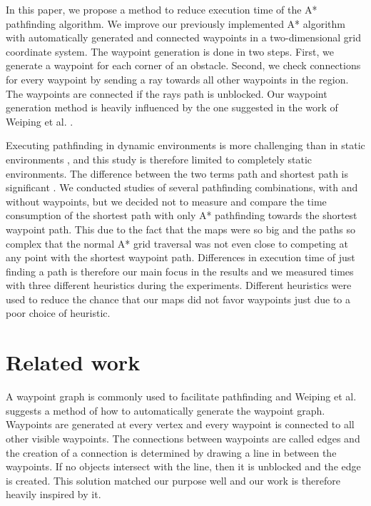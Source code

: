 \documentclass[sigconf]{acmart}
\begin{document}
In this paper, we propose a method to reduce execution time of the A* pathfinding algorithm. We improve our previously implemented A* algorithm with automatically generated and connected waypoints in a two-dimensional grid coordinate system. The waypoint generation is done in two steps. First, we generate a waypoint for each corner of an obstacle. Second, we check connections for every waypoint by sending a ray towards all other waypoints in the region. The waypoints are connected if the rays path is unblocked. Our waypoint generation method is heavily influenced by the one suggested in the work of Weiping et al. \cite{dynaPF15}.
	
Executing pathfinding in dynamic environments is more challenging than in static environments \cite{dynaPF15}, and this study is therefore limited to completely static environments. The difference between the two terms path and shortest path is significant \cite{heuristicGame15}. We conducted studies of several pathfinding combinations, with and without waypoints, but we decided not to measure and compare the time consumption of the shortest path with only A* pathfinding towards the shortest waypoint path. This due to the fact that the maps were so big and the paths so complex that the normal A* grid traversal was not even close to competing at any point with the shortest waypoint path. Differences in execution time of just finding a path is therefore our main focus in the results and we measured times with three different heuristics during the experiments. Different heuristics were used to reduce the chance that our maps did not favor waypoints just due to a poor choice of heuristic.

\section{Related work}
A waypoint graph is commonly used to facilitate pathfinding and Weiping et al. \cite{dynaPF15} suggests a method of how to automatically generate the waypoint graph. Waypoints are generated at every vertex and every waypoint is connected to all other visible waypoints. The connections between waypoints are called edges \cite{dynaPF15} and the creation of a connection is determined by drawing a line in between the waypoints. If no objects intersect with the line, then it is unblocked and the edge is created. This solution matched our purpose well and our work is therefore heavily inspired by it.
\end{document}
